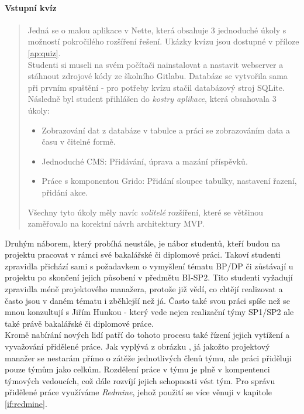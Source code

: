 \paragraph{Vstupní kvíz} \label{DBSmanagement:quiz}
\begin{quote}
Jedná se o malou aplikace v Nette, která obsahuje 3 jednoduché úkoly s možností pokročilého rozšíření řešení. Ukázky kvízu jsou dostupné v příloze \ref{ap:quiz}.\\
Studenti si museli na svém počítači nainstalovat a nastavit webserver a stáhnout zdrojové kódy ze školního Gitlabu. Databáze se vytvořila sama při prvním spuštění - pro potřeby kvízu stačil databázový stroj SQLite. Následně byl student přihlášen do \emph{kostry aplikace}, která obsahovala 3 úkoly:
\begin{itemize}
	\item Zobrazování dat z databáze v tabulce a práci se zobrazováním data a času v čitelné formě.
	\item Jednoduché CMS: Přidávání, úprava a mazání příspěvků.
	\item Práce s komponentou Grido: Přidání sloupce tabulky, nastavení řazení, přidání akce.
\end{itemize}
Všechny tyto úkoly měly navíc \emph{volitelé} rozšíření, které se většinou zaměřovalo na korektní návrh architektury MVP. 
\end{quote}

Druhým náborem, který probíhá neustále, je nábor studentů, kteří budou na projektu pracovat v rámci své bakalářské či diplomové práci. Takoví studenti zpravidla přichází sami s požadavkem o vymyšlení tématu BP/DP či zůstávají u projektu po skončení jejich působení v předmětu BI-SP2. Tito studenti vyžadují zpravidla méně  projektového manažera, protože již vědí, co chtějí realizovat a často jsou v daném tématu i zběhlejší než já. Často také svou práci spíše než se mnou konzultují s Jiřím Hunkou - který vede nejen realizační týmy SP1/SP2 ale také právě bakalářské či diplomové práce.\\

Kromě nabírání nových lidí patří do tohoto procesu také řízení jejich vytížení a vyvažování přidělené práce. Jak vyplývá z obrázku , já jakožto projektový manažer se nestarám přímo o zátěže jednotlivých členů týmu, ale práci přiděluji pouze týmům jako celkům. Rozdělení práce v týmu je plně v kompentenci týmových vedoucích, což dále rozvíjí jejich schopnosti vést tým. Pro správu přidělené práce využíváme \emph{Redmine}, jehož použití se více věnuji v kapitole \ref{if:redmine}.

